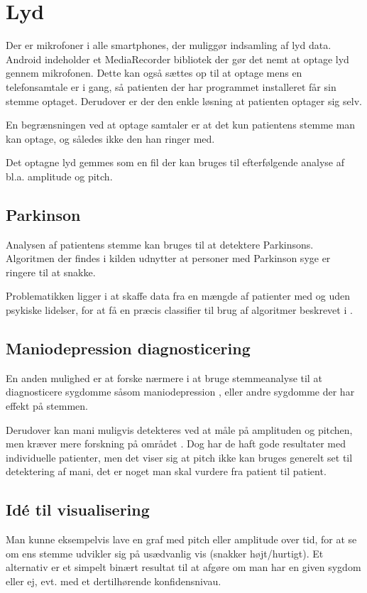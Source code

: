 \section{Lyd}
Der er mikrofoner i alle smartphones, der muliggør indsamling af lyd data.
Android indeholder et MediaRecorder bibliotek der gør det nemt at optage lyd gennem mikrofonen. Dette kan også sættes op til at optage mens en telefonsamtale er i gang, så patienten der har programmet installeret får sin stemme optaget.
Derudover er der den enkle løsning at patienten optager sig selv.

En begrænsningen ved at optage samtaler er at det kun patientens stemme man kan optage, og således ikke den han ringer med.

Det optagne lyd gemmes som en fil der kan bruges til efterfølgende analyse af bl.a. amplitude og pitch.

\subsection{Parkinson}
Analysen af patientens stemme kan bruges til at detektere Parkinsons\citep{6168572}.
Algoritmen der findes i kilden udnytter at personer med Parkinson syge er ringere til at snakke.

Problematikken ligger i at skaffe data fra en mængde af patienter med og uden psykiske lidelser, for at få en præcis classifier til brug af algoritmer beskrevet i \citep{6168572,6346375}.


\subsection{Maniodepression diagnosticering}
En anden mulighed er at forske nærmere i at bruge stemmeanalyse til at diagnosticere sygdomme såsom maniodepression \citep{6346375}, eller andre sygdomme der har effekt på stemmen.

Derudover kan mani muligvis detekteres ved at måle på amplituden og pitchen, men kræver mere forskning på området \citep{6346375}.
Dog har de haft gode resultater med individuelle patienter, men det viser sig at pitch ikke kan bruges generelt set til detektering af mani, det er noget man skal vurdere fra patient til patient.
	
\subsection{Idé til visualisering}
Man kunne eksempelvis lave en graf med pitch eller amplitude over tid, for at se om ens stemme udvikler sig på usædvanlig vis (snakker højt/hurtigt).
Et alternativ er et simpelt binært resultat til at afgøre om man har en given sygdom eller ej, evt. med et dertilhørende konfidensnivau.
